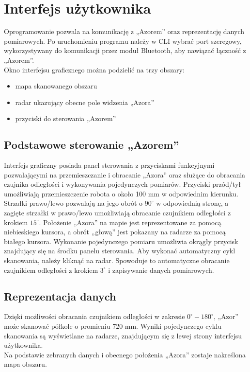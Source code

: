 \section{Interfejs użytkownika}
    Oprogramowanie pozwala na komunikację z „Azorem” oraz reprezentację danych pomiarowych. Po uruchomieniu 
    programu należy w CLI wybrać port szeregowy, wykorzystywany do komunikacji przez moduł Bluetooth, aby nawiązać
    łączność z „Azorem”.\\
    Okno interfejsu graficznego można podzielić na trzy obszary:
    \begin{itemize}
        \item mapa skanowanego obszaru
        \item radar ukazujący obecne pole widzenia „Azora”
        \item przyciski do sterowania „Azorem”
    \end{itemize}
    \subsection{Podstawowe sterowanie „Azorem”}
        Interfejs graficzny posiada panel sterowania z przyciskami funkcyjnymi pozwalającymi na przemieszczanie 
        i obracanie „Azora” oraz służące do obracania czujnika odległości i wykonywania pojedynczych pomiarów. 
        Przyciski przód/tył umożliwiają przemieszczenie robota o około 100 mm w odpowiednim kierunku. Strzałki 
        prawo/lewo pozwalają na jego obrót o $90^\circ$ w odpowiednią stronę, a zagięte strzałki w prawo/lewo 
        umożliwiają obracanie czujnikiem odległości z krokiem $15^\circ$. Położenie „Azora” na mapie jest 
        reprezentowane za pomocą niebieskiego kursora, a obrót „głową” jest pokazany na radarze za pomocą białego 
        kursora. Wykonanie pojedynczego pomiaru umożliwia okrągły przycisk znajdujący się na środku panelu sterowania. 
        Aby wykonać automatyczny cykl skanowania, należy kliknąć na radar. Spowoduje to automatyczne obracanie 
        czujnikiem odległości z krokiem $3^\circ$ i zapisywanie danych pomiarowych.
    \subsection{Reprezentacja danych}
        Dzięki możliwości obracania czujnikiem odległości w zakresie $0^\circ-180^\circ$, „Azor” może skanować
        półkole o promieniu 720 mm. Wyniki pojedynczego cyklu skanowania są wyświetlane na radarze, znajdującym się
        z lewej strony interfejsu użytkownika.\\
        Na podstawie zebranych danych i obecnego położenia „Azora” zostaje nakreślona mapa obszaru.
